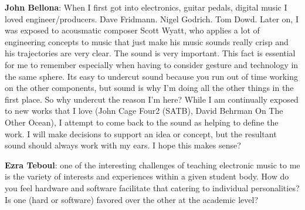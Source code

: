 \textbf{John Bellona}: When I first got into electronics, guitar pedals, digital music I
loved engineer/producers. Dave Fridmann. Nigel Godrich. Tom Dowd. Later on, I was
exposed to acousmatic composer Scott Wyatt, who applies a lot of engineering concepts to
music that just make his music sounds really crisp and his trajectories are very clear.
The sound is very important. This fact is essential for me to remember especially when
having to consider gesture and technology in the same sphere. Its easy to undercut sound
because you run out of time working on the other components, but sound is why I'm doing
all the other things in the first place. So why undercut the reason I'm here? While I am
continually exposed to new works that I love (John Cage Four2 (SATB), David Behrman On
The Other Ocean), I attempt to come back to the sound as helping to define the work. I
will make decisions to support an idea or concept, but the resultant sound should always
work with my ears. I hope this makes sense?

\textbf{Ezra Teboul}: one of the interesting challenges of teaching electronic music to
me is the variety of interests and experiences within a given student body. How do you
feel hardware and software facilitate that catering to individual personalities? Is one
(hard or software) favored over the other at the academic level?

